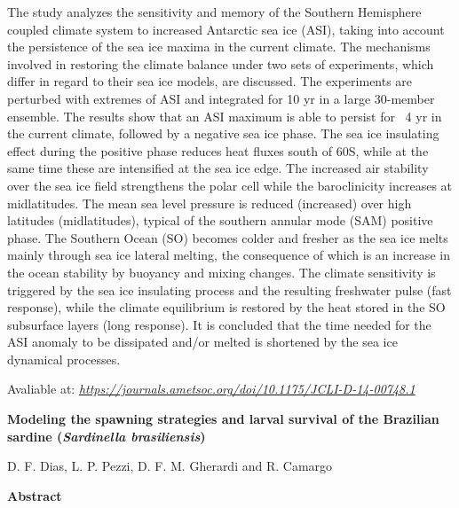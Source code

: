  The study analyzes the sensitivity and memory of the Southern Hemisphere coupled climate system to increased Antarctic sea ice (ASI), taking into account the persistence of the sea ice maxima
          in the current climate. The mechanisms involved in restoring the climate balance under two sets of experiments, which differ in regard to their sea ice models, are discussed. The experiments 
          are perturbed with extremes of ASI and integrated for 10 yr in a large 30-member ensemble. The results show that an ASI maximum is able to persist for ~4 yr in the current climate, 
          followed by a negative sea ice phase. The sea ice insulating effect during the positive phase reduces heat fluxes south of 60\degree S, while at the same time these are intensified at the 
          sea ice edge. The increased air stability over the sea ice field strengthens the polar cell while the baroclinicity increases at midlatitudes. The mean sea level pressure is reduced 
          (increased) over high latitudes (midlatitudes), typical of the southern annular mode (SAM) positive phase. The Southern Ocean (SO) becomes colder and fresher as the sea ice melts mainly through 
          sea ice lateral melting, the consequence of which is an increase in the ocean stability by buoyancy and mixing changes. The climate sensitivity is triggered by the sea ice insulating process and 
          the resulting freshwater pulse (fast response), while the climate equilibrium is restored by the heat stored in the SO subsurface layers (long response). It is concluded that the time needed for 
          the ASI anomaly to be dissipated and/or melted is shortened by the sea ice dynamical processes.

\bigskip
\bigskip

 Avaliable at: \textcolor{bleu_cite}{\href{https://journals.ametsoc.org/doi/10.1175/JCLI-D-14-00748.1}{\textit{https://journals.ametsoc.org/doi/10.1175/JCLI-D-14-00748.1}}}

\bigskip

\newpage
\bigskip

 \begin{center} \textbf{Modeling the spawning strategies and larval survival of the Brazilian sardine (\textit{Sardinella brasiliensis})}
\bigskip

 D. F. Dias, L. P. Pezzi, D. F. M. Gherardi and R. Camargo
\bigskip

 \textbf{Abstract}\end{center}
\bigskip

